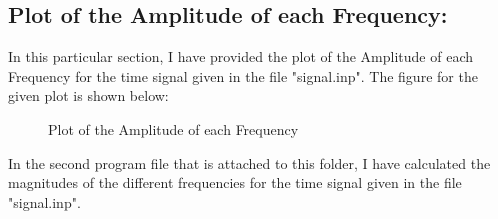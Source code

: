 \documentclass[12pt,a4paper]{article}
\begin{document}
\subsection{Plot of the Amplitude of each Frequency:}
In this particular section, I have provided the plot of the Amplitude of each Frequency for the time signal given in the file "signal.inp". The figure for the given plot is shown below:
\begin{figure}[!ht]
	\begin{center}
	\end{center}
	\caption{Plot of the Amplitude of each Frequency}
\end{figure}
\clearpage
\noindent
In the second program file that is attached to this folder, I have calculated the magnitudes of the different frequencies for the time signal given in the file "signal.inp".
\end{document}
